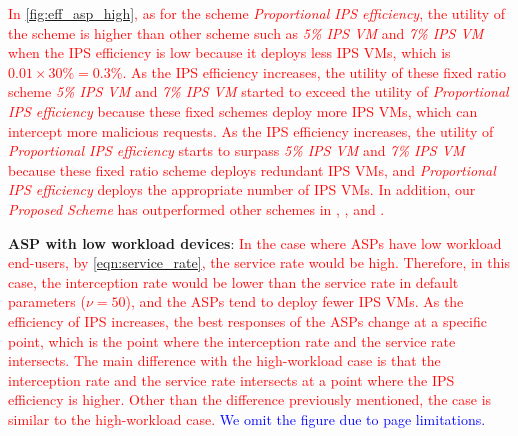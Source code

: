 \documentclass[10pt,journal, compsoc]{IEEEtran}
\begin{document}
\textcolor{red}{
In \cref{fig:eff_asp_high}, as for the scheme \textit{Proportional IPS efficiency}, the utility of the scheme is higher than other scheme such as \textit{5\% IPS VM} and \textit{7\% IPS VM} when the IPS efficiency is low because it deploys less IPS VMs, which is $0.01 \times 30\% = 0.3\%$. As the IPS efficiency increases, the utility of these fixed ratio scheme \textit{5\% IPS VM} and \textit{7\% IPS VM} started to exceed the utility of \textit{Proportional IPS efficiency} because these fixed schemes deploy more IPS VMs, which can intercept more malicious requests. As the IPS efficiency increases, the utility of \textit{Proportional IPS efficiency} starts to surpass \textit{5\% IPS VM} and \textit{7\% IPS VM} because these fixed ratio scheme deploys redundant IPS VMs, and \textit{Proportional IPS efficiency} deploys the appropriate number of IPS VMs. In addition, our \textit{Proposed Scheme} has outperformed other schemes in , , and .}

\textbf{ASP with low workload devices}:
\textcolor{red}{
In the case where ASPs have low workload end-users, by \cref{eqn:service_rate}, the service rate would be high. Therefore, in this case, the interception rate would be lower than the service rate in default parameters ($\nu = 50$), and the ASPs tend to deploy fewer IPS VMs. As the efficiency of IPS increases, the best responses of the ASPs change at a specific point, which is the point where the interception rate and the service rate intersects. The main difference with the high-workload case is that the interception rate and the service rate intersects at a point where the IPS efficiency is higher. Other than the difference previously mentioned, the case is similar to the high-workload case.} \textcolor{blue}{We omit the figure due to page limitations.}
\end{document}
